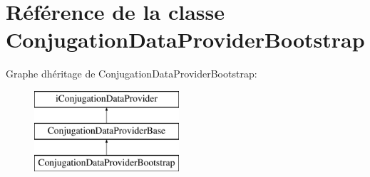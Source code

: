 \hypertarget{classConjugationDataProviderBootstrap}{}\section{Référence de la classe Conjugation\+Data\+Provider\+Bootstrap}
\label{classConjugationDataProviderBootstrap}
Graphe d\textquotesingle{}héritage de Conjugation\+Data\+Provider\+Bootstrap\+:\begin{figure}[H]
\begin{center}
\leavevmode
\includegraphics[height=3.000000cm]{classConjugationDataProviderBootstrap}
\end{center}
\end{figure}
